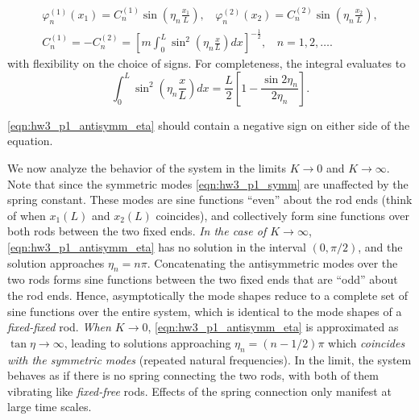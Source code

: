 \begin{enumerate}[(1)]
{\begin{equation}
\begin{gathered}
        \varphi_n^{(1)}(x_1) = C_n^{(1)} \sin \left(\eta_n \frac{x_1}{L} \right), ~~~~
        \varphi_n^{(2)}(x_2) = C_n^{(2)} \sin \left(\eta_n \frac{x_2}{L} \right), \\
        C_n^{(1)} = -C_n^{(2)} = {\left[m \int_0^L \sin^2\left(\eta_n \frac{x}{L}\right) dx\right]}^{-\frac{1}{2}}, ~~~~ n = 1, 2, \ldots.
    \end{gathered}
    \end{equation}
    with flexibility on the choice of signs. 
    For completeness, the integral evaluates to 
    \begin{equation}
        \int_0^L \sin^2\left(\eta_n \frac{x}{L}\right) dx = \frac{L}{2}\left[1 - \frac{\sin 2\eta_n}{2\eta_n} \right].
    \end{equation}

    \begin{errata}
    \cref{eqn:hw3_p1_antisymm_eta} should contain a negative sign on either side of the equation.
    \end{errata}
}
\end{enumerate}

We now analyze the behavior of the system in the limits $K \rightarrow 0$ and $K \rightarrow \infty$.
Note that since the symmetric modes \cref{eqn:hw3_p1_symm} are unaffected by the spring constant. 
These modes are sine functions ``even'' about the rod ends (think of when $x_1(L)$ and $x_2(L)$ coincides), and collectively form sine functions over both rods between the two fixed ends. 
\emph{In the case of $K \rightarrow \infty$}, \cref{eqn:hw3_p1_antisymm_eta} has no solution in the interval $(0, \pi/2)$, and the solution approaches $\eta_n = n\pi$. 
Concatenating the antisymmetric modes over the two rods forms sine functions between the two fixed ends that are ``odd'' about the rod ends.
Hence, asymptotically the mode shapes reduce to a complete set of sine functions over the entire system, which is identical to the mode shapes of a \emph{fixed-fixed} rod. 
\emph{When $K \rightarrow 0$}, \cref{eqn:hw3_p1_antisymm_eta} is approximated as $\tan\eta \rightarrow\infty$, leading to solutions approaching $\eta_n = (n - 1/2)\pi$ which \emph{coincides with the symmetric modes} (repeated natural frequencies). 
In the limit, the system behaves as if there is no spring connecting the two rods, with both of them vibrating like \emph{fixed-free} rods. 
Effects of the spring connection only manifest at large time scales.

